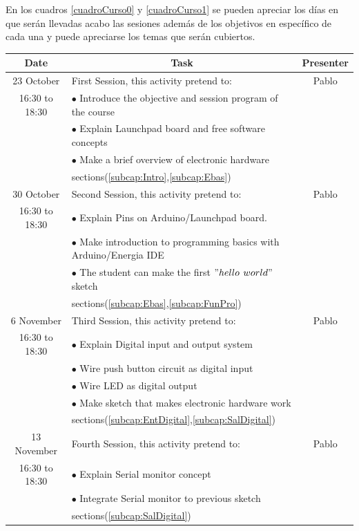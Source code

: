 \documentclass[]{article}
\begin{document}
En los cuadros \ref{cuadroCurso0} y \ref{cuadroCurso1} se pueden apreciar los días en que serán llevadas acabo las sesiones además de los objetivos en específico de cada una y puede apreciarse los temas que serán cubiertos.\\



\begin{table}[h!]
	\centering
	\begin{tabular}{|c|l|c|}
		\hline
		\textbf{Date} & \multicolumn{1}{c}{\textbf{Task}}  & \textbf{Presenter}      \\ \hline
		23 October & First Session, this activity pretend to:   & Pablo     \\ 
		16:30 to 18:30 & $\bullet$ Introduce the objective and session program of the course &     \\
		& $\bullet$ Explain Launchpad board and free software concepts &     \\ 
		& $\bullet$ Make a brief overview of electronic hardware & \\
		& sections(\ref{subcap:Intro},\ref{subcap:Ebas})& \\ \hline
		
		30 October & Second Session, this activity pretend to:  & Pablo \\
		16:30 to 18:30     & 	$\bullet$ Explain Pins on Arduino/Launchpad board. &     \\
		& $\bullet$ Make introduction to programming basics with Arduino/Energia IDE &  \\ 
		& $\bullet$ The student can make the first $"hello$ $world"$ sketch & \\ 
		& sections(\ref{subcap:Ebas},\ref{subcap:FunPro})&  \\ \hline
		
		6 November & Third Session, this activity pretend to: & Pablo \\
		16:30 to 18:30	 & 	$\bullet$ Explain Digital input and output system &     \\
		& $\bullet$ Wire push button circuit as digital input &     \\  
		& $\bullet$ Wire LED as digital output &\\ 
		& $\bullet$ Make sketch that makes electronic hardware work & \\ 
		& sections(\ref{subcap:EntDigital},\ref{subcap:SalDigital})& \\ \hline
		
		13 November & Fourth Session, this activity pretend to:  & Pablo \\ 
		16:30 to 18:30 & $\bullet$ Explain Serial monitor concept &     \\
		& $\bullet$ Integrate Serial monitor to previous sketch &     \\ 
		& sections(\ref{subcap:SalDigital}) & \\ \hline
		

\end{tabular}
\end{table}
\end{document}
